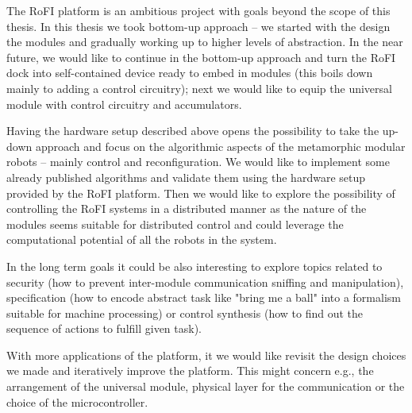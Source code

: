 The RoFI platform is an ambitious project with goals beyond the scope of this
thesis. In this thesis we took bottom-up approach -- we started with the design
the modules and gradually working up to higher levels of abstraction. In the
near future, we would like to continue in the bottom-up approach and turn the
RoFI dock into self-contained device ready to embed in modules (this boils down
mainly to adding a control circuitry); next we would like to equip the universal
module with control circuitry and accumulators.

Having the hardware setup described above opens the possibility to take the
up-down approach and focus on the algorithmic aspects of the metamorphic modular
robots -- mainly control and reconfiguration. We would like to implement some
already published algorithms and validate them using the hardware setup provided
by the RoFI platform. Then we would like to explore the possibility of
controlling the RoFI systems in a distributed manner as the nature of the
modules seems suitable for distributed control and could leverage the
computational potential of all the robots in the system.

In the long term goals it could be also interesting to explore topics related to
security (how to prevent inter-module communication sniffing and manipulation),
specification (how to encode abstract task like "bring me a ball" into a
formalism suitable for machine processing) or control synthesis (how to find out
the sequence of actions to fulfill given task).

With more applications of the platform, it we would like revisit the design
choices we made and iteratively improve the platform. This might concern e.g.,
the arrangement of the universal module, physical layer for the communication or
the choice of the microcontroller.